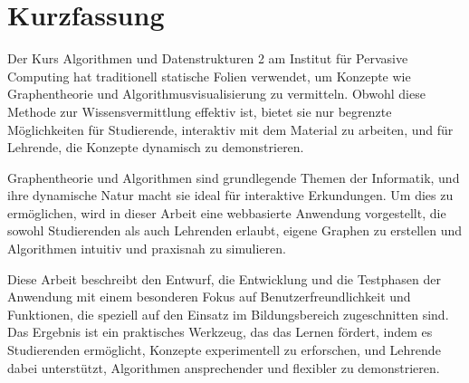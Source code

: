 \section*{Kurzfassung}
\label{sec:kurzfassung}
Der Kurs Algorithmen und Datenstrukturen 2 am Institut für Pervasive Computing hat traditionell statische Folien verwendet, um Konzepte wie Graphentheorie und Algorithmusvisualisierung zu vermitteln. Obwohl diese Methode zur Wissensvermittlung effektiv ist, bietet sie nur begrenzte Möglichkeiten für Studierende, interaktiv mit dem Material zu arbeiten, und für Lehrende, die Konzepte dynamisch zu demonstrieren.

Graphentheorie und Algorithmen sind grundlegende Themen der Informatik, und ihre dynamische Natur macht sie ideal für interaktive Erkundungen. Um dies zu ermöglichen, wird in dieser Arbeit eine webbasierte Anwendung vorgestellt, die sowohl Studierenden als auch Lehrenden erlaubt, eigene Graphen zu erstellen und Algorithmen intuitiv und praxisnah zu simulieren.

Diese Arbeit beschreibt den Entwurf, die Entwicklung und die Testphasen der Anwendung mit einem besonderen Fokus auf Benutzerfreundlichkeit und Funktionen, die speziell auf den Einsatz im Bildungsbereich zugeschnitten sind. Das Ergebnis ist ein praktisches Werkzeug, das das Lernen fördert, indem es Studierenden ermöglicht, Konzepte experimentell zu erforschen, und Lehrende dabei unterstützt, Algorithmen ansprechender und flexibler zu demonstrieren.